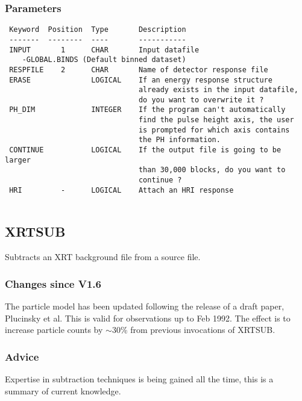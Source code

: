 \documentclass{book}
\renewcommand{\_}{{\tt\char'137}}     %
\begin{document}
\subsubsection{Parameters}
\begin{verbatim}
 Keyword  Position  Type       Description
 -------  --------  ----       -----------
 INPUT       1      CHAR       Input datafile
    -GLOBAL.BINDS (Default binned dataset)
 RESPFILE    2      CHAR       Name of detector response file
 ERASE              LOGICAL    If an energy response structure
                               already exists in the input datafile,
                               do you want to overwrite it ?
 PH_DIM             INTEGER    If the program can't automatically
                               find the pulse height axis, the user
                               is prompted for which axis contains
                               the PH information.
 CONTINUE           LOGICAL    If the output file is going to be larger
                               than 30,000 blocks, do you want to
                               continue ?
 HRI         -      LOGICAL    Attach an HRI response
 
\end{verbatim}\subsection{XRTSUB}
Subtracts an XRT background file from a source file.
 
\subsubsection{Changes since V1.6}
The particle model has been updated following the release of a draft paper,
Plucinsky et al. This is valid for observations up to Feb 1992.
The effect is to increase particle counts by $\sim$30\% from previous invocations
of XRTSUB.
 
\subsubsection{Advice}
Expertise in subtraction techniques is being gained all the time, this
is a summary of current knowledge.
 
\end{document}
